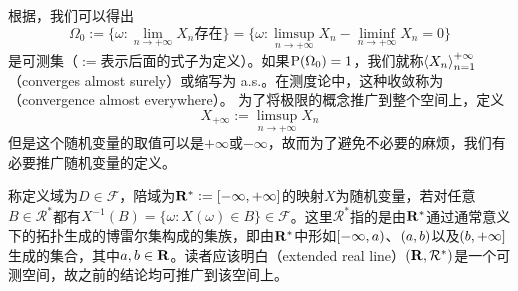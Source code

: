 \documentclass[../main.tex]{subfiles}
\begin{document}
根据，我们可以得出
\[\Omega_0:=\{\omega: \lim\limits_{n\rightarrow+\infty}X_n\text{存在}\}=\{\omega:\limsup\limits_{n\rightarrow+\infty}X_n-\liminf\limits_{n\rightarrow+\infty}X_n=0\}\]
是可测集（\(:=\)表示后面的式子为定义）。如果\(\operatorname{\mathrm{P}}(\Omega_0)=1\)，我们就称\(\left<X_n\right>^{+\infty}_{n=1}\)（converges almost surely）或缩写为 a.s.。在测度论中，这种收敛称为（convergence almost everywhere）。
为了将极限的概念推广到整个空间上，定义
\[X_{+\infty}:=\limsup\limits_{n\rightarrow+\infty}X_n\]
但是这个随机变量的取值可以是\(+\infty\)或\(-\infty\)，故而为了避免不必要的麻烦，我们有必要推广随机变量的定义。

称定义域为\(D\in\mathcal{F}\)，陪域为\(\R^*:=\intcc{-\infty,+\infty}\)的映射\(X\)为随机变量，若对任意\(B\in\mathcal{R}^*\)都有\(X^{-1}(B)=\{\omega: X(\omega)\in B\}\in\mathcal{F}\)。这里\(\mathcal{R}^*\)指的是由\(\mathbf{R}^*\)通过通常意义下的拓扑生成的博雷尔集构成的集族，即由\(\mathbf{R}^*\)中形如\(\intco{-\infty,a}\)、\(\intoo{a,b}\)以及\(\intoc{b,+\infty}\)生成的集合，其中\(a,b\in\mathbf{R}\)。读者应该明白（extended real line）\((\mathbf{R},\mathcal{R}^*)\)是一个可测空间，故之前的结论均可推广到该空间上。
\end{document}
